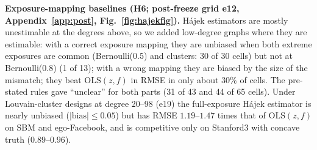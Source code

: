 \textbf{Exposure-mapping baselines (H6; post-freeze grid e12, Appendix~\ref{app:post}, Fig.~\ref{fig:hajekfig}).} Hájek estimators are mostly unestimable at the degrees above, so we added low-degree graphs where they are estimable: with a correct exposure mapping they are unbiased when both extreme exposures are common (Bernoulli(0.5) and clusters: 30 of 30 cells) but not at Bernoulli(0.8) (1 of 13); with a wrong mapping they are biased by the size of the mismatch; they beat OLS$(z,f)$ in RMSE in only about 30\% of cells. The pre-stated rules gave ``unclear'' for both parts (31 of 43 and 44 of 65 cells). Under Louvain-cluster designs at degree 20--98 (e19) the full-exposure Hájek estimator is nearly unbiased ($|\text{bias}|\le0.05$) but has RMSE $1.19$--$1.47$ times that of OLS$(z,f)$ on SBM and ego-Facebook, and is competitive only on Stanford3 with concave truth ($0.89$--$0.96$).
\begin{table}[tbp]
\caption{Estimators on the default scenario (SBM, Bernoulli(0.5), $\gamma=2$, $\tau_G=3$): bias (MC SE), SD, RMSE. Source: \texttt{results/summary/e2.csv}; generated by \texttt{figures/scripts/make\_tables.py}.}
\label{tab:est}
\centering\scriptsize\setlength\tabcolsep{3pt}

\end{table}

